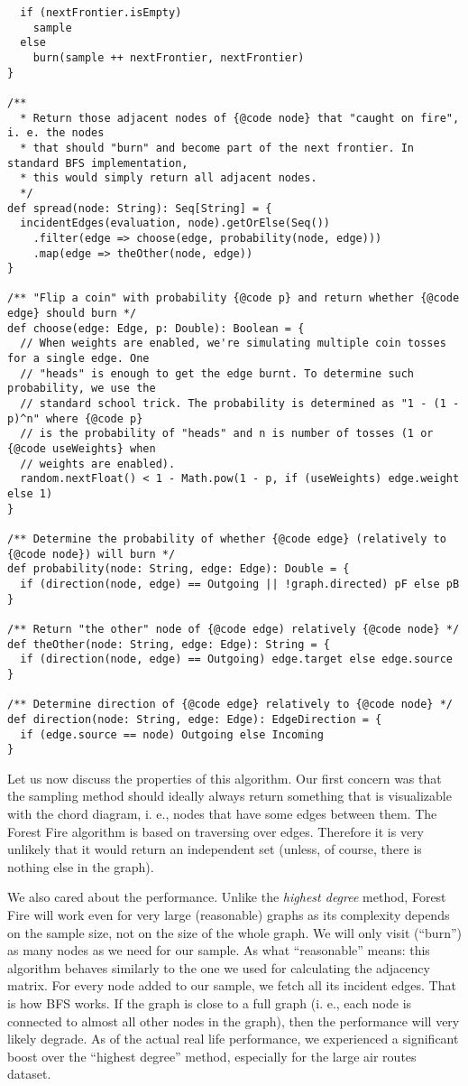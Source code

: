 \begin{verbatim}
  if (nextFrontier.isEmpty)
    sample
  else
    burn(sample ++ nextFrontier, nextFrontier)
}

/**
  * Return those adjacent nodes of {@code node} that "caught on fire", i. e. the nodes
  * that should "burn" and become part of the next frontier. In standard BFS implementation,
  * this would simply return all adjacent nodes.
  */
def spread(node: String): Seq[String] = {
  incidentEdges(evaluation, node).getOrElse(Seq())
    .filter(edge => choose(edge, probability(node, edge)))
    .map(edge => theOther(node, edge))
}

/** "Flip a coin" with probability {@code p} and return whether {@code edge} should burn */
def choose(edge: Edge, p: Double): Boolean = {
  // When weights are enabled, we're simulating multiple coin tosses for a single edge. One
  // "heads" is enough to get the edge burnt. To determine such probability, we use the
  // standard school trick. The probability is determined as "1 - (1 - p)^n" where {@code p}
  // is the probability of "heads" and n is number of tosses (1 or {@code useWeights} when
  // weights are enabled).
  random.nextFloat() < 1 - Math.pow(1 - p, if (useWeights) edge.weight else 1)
}

/** Determine the probability of whether {@code edge} (relatively to {@code node}) will burn */
def probability(node: String, edge: Edge): Double = {
  if (direction(node, edge) == Outgoing || !graph.directed) pF else pB
}

/** Return "the other" node of {@code edge) relatively {@code node} */
def theOther(node: String, edge: Edge): String = {
  if (direction(node, edge) == Outgoing) edge.target else edge.source
}

/** Determine direction of {@code edge} relatively to {@code node} */
def direction(node: String, edge: Edge): EdgeDirection = {
  if (edge.source == node) Outgoing else Incoming
}
\end{verbatim}

Let us now discuss the properties of this algorithm. Our first concern was that the sampling method should ideally always return something that is visualizable with the chord diagram, i. e., nodes that have some edges between them. The  Forest Fire algorithm is based on traversing over edges. Therefore it is very unlikely that it would return an independent set (unless, of course, there is nothing else in the graph).

We also cared about the performance. Unlike the \emph{highest degree} method, Forest Fire will work even for very large (reasonable) graphs as its complexity depends on the sample size, not on the size of the whole graph. We will only visit (“burn”) as many nodes as we need for our sample. As what “reasonable” means: this algorithm behaves similarly to the one we used for calculating the adjacency matrix. For every node added to our sample, we fetch all its incident edges. That is how BFS works. If the graph is close to a full graph (i. e., each node is connected to almost all other nodes in the graph), then the performance will very likely degrade. As of the actual real life performance, we experienced a significant boost over the “highest degree” method, especially for the large air routes dataset.